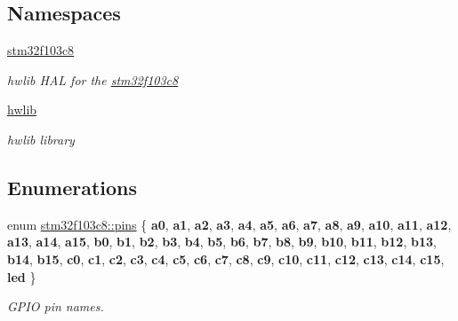 \subsection*{Namespaces}
\begin{DoxyCompactItemize}
\item 
 \hyperlink{namespacestm32f103c8}{stm32f103c8}
\begin{DoxyCompactList}\small\item\em hwlib H\+AL for the \hyperlink{namespacestm32f103c8}{stm32f103c8} \end{DoxyCompactList}\item 
 \hyperlink{namespacehwlib}{hwlib}
\begin{DoxyCompactList}\small\item\em hwlib library \end{DoxyCompactList}\end{DoxyCompactItemize}
\subsection*{Enumerations}
\begin{DoxyCompactItemize}
\item 
\mbox{\label{namespacestm32f103c8_a69d642506db309a7e64295d35ec21ff6}} 
enum \hyperlink{namespacestm32f103c8_a69d642506db309a7e64295d35ec21ff6}{stm32f103c8\+::pins} \{ \newline
{\bfseries a0}, 
{\bfseries a1}, 
{\bfseries a2}, 
{\bfseries a3}, 
\newline
{\bfseries a4}, 
{\bfseries a5}, 
{\bfseries a6}, 
{\bfseries a7}, 
\newline
{\bfseries a8}, 
{\bfseries a9}, 
{\bfseries a10}, 
{\bfseries a11}, 
\newline
{\bfseries a12}, 
{\bfseries a13}, 
{\bfseries a14}, 
{\bfseries a15}, 
\newline
{\bfseries b0}, 
{\bfseries b1}, 
{\bfseries b2}, 
{\bfseries b3}, 
\newline
{\bfseries b4}, 
{\bfseries b5}, 
{\bfseries b6}, 
{\bfseries b7}, 
\newline
{\bfseries b8}, 
{\bfseries b9}, 
{\bfseries b10}, 
{\bfseries b11}, 
\newline
{\bfseries b12}, 
{\bfseries b13}, 
{\bfseries b14}, 
{\bfseries b15}, 
\newline
{\bfseries c0}, 
{\bfseries c1}, 
{\bfseries c2}, 
{\bfseries c3}, 
\newline
{\bfseries c4}, 
{\bfseries c5}, 
{\bfseries c6}, 
{\bfseries c7}, 
\newline
{\bfseries c8}, 
{\bfseries c9}, 
{\bfseries c10}, 
{\bfseries c11}, 
\newline
{\bfseries c12}, 
{\bfseries c13}, 
{\bfseries c14}, 
{\bfseries c15}, 
\newline
{\bfseries led}
 \}\begin{DoxyCompactList}\small\item\em G\+P\+IO pin names. \end{DoxyCompactList}
\end{DoxyCompactItemize}
